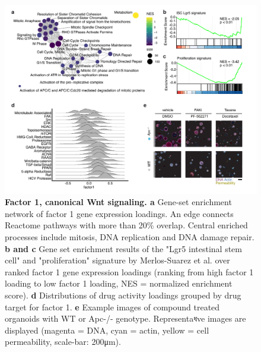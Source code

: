 \begin{flushleft}
\begin{figure}[h]
\centering
\includegraphics[width=\textwidth,
                height=\textheight,
                keepaspectratio]{figures/adenomaprofiling/pdf/fig_2_1.pdf}
\caption{\textbf{Factor 1, canonical Wnt signaling. a} Gene-set enrichment network of factor 1 gene expression loadings. An edge connects Reactome pathways with more than 20\% overlap. Central enriched processes include mitosis, DNA replication and DNA damage repair. \textbf{b and c} Gene set enrichment results of the "Lgr5 intestinal stem cell" and "proliferation" signature by Merlos-Suarez et al. over ranked factor 1 gene expression loadings (ranking from high factor 1 loading to low factor 1 loading, NES = normalized enrichment score). \textbf{d} Distributions of drug activity loadings grouped by drug target for factor 1. \textbf{e} Example images of compound treated organoids with WT or Apc-/- genotype. Representaধve images are displayed (magenta = DNA, cyan = actin, yellow = cell permeability, scale-bar: 200μm).}
\label{fig_190}
\end{figure}
\bigbreak


\end{flushleft}
